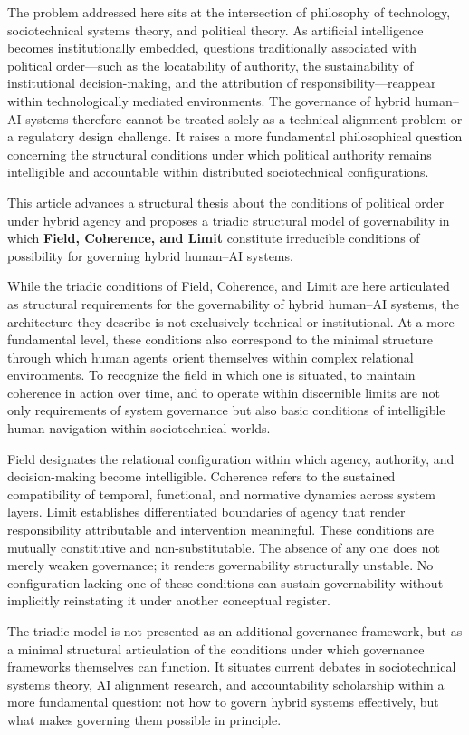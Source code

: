 \documentclass[12pt]{article}
\begin{document}
The problem addressed here sits at the intersection of philosophy of technology, sociotechnical systems theory, and political theory. As artificial intelligence becomes institutionally embedded, questions traditionally associated with political order—such as the locatability of authority, the sustainability of institutional decision-making, and the attribution of responsibility—reappear within technologically mediated environments. The governance of hybrid human–AI systems therefore cannot be treated solely as a technical alignment problem or a regulatory design challenge. It raises a more fundamental philosophical question concerning the structural conditions under which political authority remains intelligible and accountable within distributed sociotechnical configurations.

This article advances a structural thesis about the conditions of political order under hybrid agency and proposes a triadic structural model of governability in which \textbf{Field, Coherence, and Limit} constitute irreducible conditions of possibility for governing hybrid human–AI systems.

While the triadic conditions of Field, Coherence, and Limit are here articulated as structural requirements for the governability of hybrid human–AI systems, the architecture they describe is not exclusively technical or institutional. At a more fundamental level, these conditions also correspond to the minimal structure through which human agents orient themselves within complex relational environments. To recognize the field in which one is situated, to maintain coherence in action over time, and to operate within discernible limits are not only requirements of system governance but also basic conditions of intelligible human navigation within sociotechnical worlds.

Field designates the relational configuration within which agency, authority, and decision-making become intelligible. Coherence refers to the sustained compatibility of temporal, functional, and normative dynamics across system layers. Limit establishes differentiated boundaries of agency that render responsibility attributable and intervention meaningful. These conditions are mutually constitutive and non-substitutable. The absence of any one does not merely weaken governance; it renders governability structurally unstable. No configuration lacking one of these conditions can sustain governability without implicitly reinstating it under another conceptual register.

The triadic model is not presented as an additional governance framework, but as a minimal structural articulation of the conditions under which governance frameworks themselves can function. It situates current debates in sociotechnical systems theory, AI alignment research, and accountability scholarship within a more fundamental question: not how to govern hybrid systems effectively, but what makes governing them possible in principle.
\end{document}
